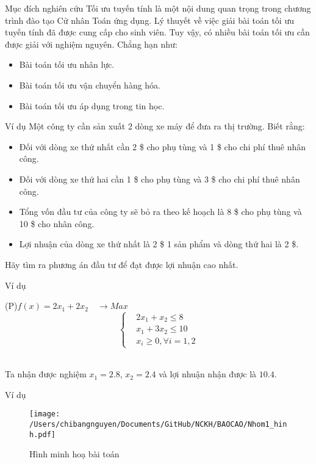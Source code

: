 \documentclass{beamer}
\begin{document}
\begin{frame}{Mục đích nghiên cứu}
    Tối ưu tuyến tính là một nội dung quan trọng trong chương trình đào tạo Cử nhân Toán ứng dụng. Lý thuyết về việc giải bài toán tối ưu tuyến tính đã được cung cấp cho sinh viên. Tuy vậy, có nhiều bài toán tối ưu cần được giải với nghiệm nguyên. Chẳng hạn như:
    \begin{itemize}
    \item Bài toán tối ưu nhân lực.
    \item Bài toán tối ưu vận chuyển hàng hóa.
    \item Bài toán tối ưu áp dụng trong tin học.
    \end{itemize}
\end{frame}
\begin{frame}{Ví dụ}
    Một công ty cần sản xuất 2 dòng xe máy để đưa ra thị trường. Biết rằng:
    \begin{itemize}
    \item Đối với dòng xe thứ nhất cần 2 \$ cho phụ tùng và 1 \$ cho chi phí thuê nhân công.
    \item Đối với dòng xe thứ hai cần 1 \$ cho phụ tùng và 3 \$ cho chi phí thuê nhân công.
    \item Tổng vốn đầu tư của công ty sẽ bỏ ra theo kế hoạch là 8 \$ cho phụ tùng và 10 \$ cho nhân công.
    \item Lợi nhuận của dòng xe thứ nhất là 2 \$ 1 sản phẩm và dòng thứ hai là 2 \$.
    \end{itemize}    
    Hãy tìm ra phương án đầu tư để đạt được lợi nhuận cao nhất.
\end{frame}
\begin{frame}{Ví dụ}
    \begin{center}                    
        \big(P\big)\quad $f(x)=2x_1+2x_2\quad \longrightarrow Max$\\
        \[\left\{\begin{aligned}
            &2x_1+x_2 \leq  8 \\
            &x_1+3x_2 \leq 10 \\
            &x_i\geq 0,\forall i=1,2
        \end{aligned}\right.\]\\
        \end{center}  
        Ta nhận được nghiệm $x_1=2.8$, $x_2=2.4$ và lợi nhuận nhận được là $10.4$.    
  
\end{frame}

\begin{frame}{Ví dụ}
    \begin{center}
        \begin{figure}[ht]
            \begin{center}

            \texttt{[image: /Users/chibangnguyen/Documents/GitHub/NCKH/BAOCAO/Nhom1\_hinh.pdf]}
            
            Hình minh hoạ bài toán
            \end{center}
      \end{figure}
      \end{center}
\end{frame}
\end{document}
